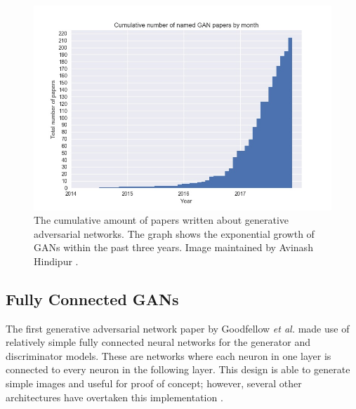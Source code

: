 \documentclass[11pt]{article}
\begin{document}
\begin{figure}
\centering
\includegraphics[scale=0.45]{cumulative_gans}
\caption{The cumulative amount of papers written about generative adversarial networks. The graph shows the exponential growth of GANs within the past three years. Image maintained by Avinash Hindipur \citep{November2017GANZoo}.}
\label{fig:CumulativeNumberofGANPapersbyMonth}
\end{figure}

\subsection{Fully Connected GANs}
The first generative adversarial network paper by Goodfellow \textit{et al.} made use of relatively simple fully connected neural networks for the generator and discriminator models. These are networks where each neuron in one layer is connected to every neuron in the following layer. This design is able to generate simple images and useful for proof of concept; however, several other architectures have overtaken this implementation \citep{2017arXiv171007035C}.
\end{document}
